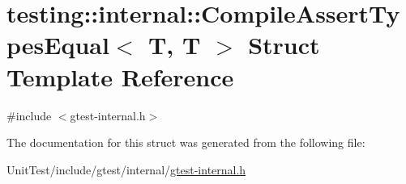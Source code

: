 \hypertarget{structtesting_1_1internal_1_1_compile_assert_types_equal_3_01_t_00_01_t_01_4}{\section{testing\+:\+:internal\+:\+:Compile\+Assert\+Types\+Equal$<$ T, T $>$ Struct Template Reference}
\label{structtesting_1_1internal_1_1_compile_assert_types_equal_3_01_t_00_01_t_01_4}
}


{\ttfamily \#include $<$gtest-\/internal.\+h$>$}



The documentation for this struct was generated from the following file\+:\begin{DoxyCompactItemize}
\item 
Unit\+Test/include/gtest/internal/\hyperlink{gtest-internal_8h}{gtest-\/internal.\+h}\end{DoxyCompactItemize}
